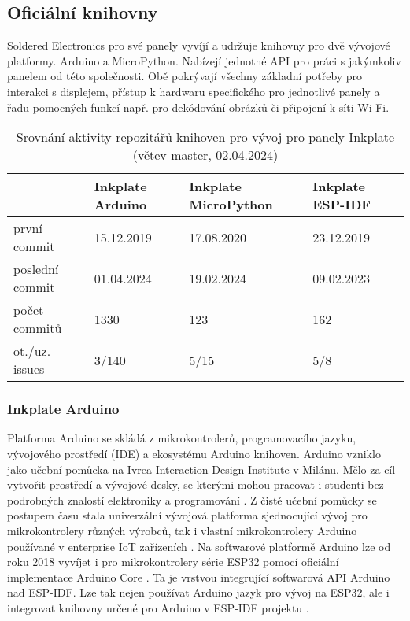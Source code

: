 \subsection{Oficiální knihovny}
Soldered Electronics pro své panely vyvíjí a udržuje knihovny pro dvě vývojové platformy. Arduino a MicroPython. Nabízejí jednotné API pro práci s jakýmkoliv panelem od této společnosti. Obě pokrývají všechny základní potřeby pro interakci s displejem, přístup k hardwaru specifického pro jednotlivé panely a řadu pomocných funkcí např. pro dekódování obrázků či připojení k síti Wi-Fi.

\begin{table}[h]
    \centering
    \caption{Srovnání aktivity repozitářů knihoven pro vývoj pro panely Inkplate (větev master, 02.04.2024)}
    \label{tab:inkplate-library-comparison}
    \begin{tabular}{llll}
        \multicolumn{1}{c}{}
            & Inkplate Arduino\cite{SolderedElectronicsInkplateArduinolibrary2024}
            & Inkplate MicroPython\cite{SolderedElectronicsInkplatemicropythonMicropython}
            & Inkplate ESP-IDF\cite{turcotteTurgu1ESPIDFInkPlate2024} \\ \hline
        první commit             & 15.12.2019 & 17.08.2020  & 23.12.2019 \\
        poslední commit          & 01.04.2024 & 19.02.2024  & 09.02.2023 \\
        počet commitů            & 1330       & 123         & 162        \\
        ot./uz. issues           & 3/140      & 5/15        & 5/8        \\ \hline
    \end{tabular}
\end{table}

\subsubsection{Inkplate Arduino}
Platforma Arduino se skládá z mikrokontrolerů, programovacího jazyku, vývojového prostředí (IDE) a ekosystému Arduino knihoven. Arduino vzniklo jako učební pomůcka na Ivrea Interaction Design Institute v Milánu. Mělo za cíl vytvořit prostředí a vývojové desky, se kterými mohou pracovat i studenti bez podrobných znalostí elektroniky a programování \cite{WhatArduino}. Z čistě učební pomůcky se postupem času stala univerzální vývojová platforma sjednocující vývoj pro mikrokontrolery různých výrobců, tak i vlastní mikrokontrolery Arduino používané v enterprise IoT zařízeních \cite{Arduino}. Na softwarové platformě Arduino lze od roku 2018 vyvíjet i pro mikrokontrolery série ESP32 pomocí oficiální implementace Arduino Core \cite{ReleasesEspressifArduinoesp32}. Ta je vrstvou integrující softwarová API Arduino nad ESP-IDF. Lze tak nejen používat Arduino jazyk pro vývoj na ESP32, ale i integrovat knihovny určené pro Arduino v ESP-IDF projektu \cite{espressifsystemsArduinoESPIDFComponent}.

